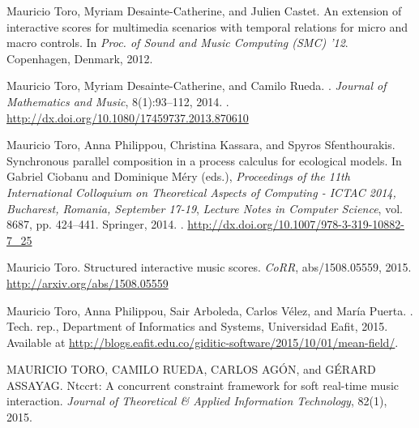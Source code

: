 \documentclass[]{lipics-iclp}
\theoremstyle{plain}\newtheorem{mainthm}[thm]{Main Theorem}
\theoremstyle{definition}\newtheorem{crucialdef}[thm]{Crucial Definition}
\begin{document}
\begin{thebibliography}{{Tor}16a}
Mauricio Toro, Myriam Desainte-Catherine, and Julien Castet.
\newblock An extension of interactive scores for multimedia scenarios with
  temporal relations for micro and macro controls.
\newblock In \emph{Proc. of Sound and Music Computing (SMC) '12}. Copenhagen,
  Denmark, 2012.

Mauricio Toro, Myriam Desainte-Catherine, and Camilo Rueda.
.
\newblock \emph{Journal of Mathematics and Music}, 8(1):93--112, 2014.
\newblock {}.
\newline\urlprefix\url{http://dx.doi.org/10.1080/17459737.2013.870610}

Mauricio Toro, Anna Philippou, Christina Kassara, and Spyros Sfenthourakis.
\newblock Synchronous parallel composition in a process calculus for ecological
  models.
\newblock In Gabriel Ciobanu and Dominique M{\'{e}}ry (eds.), \emph{Proceedings
  of the 11th International Colloquium on Theoretical Aspects of Computing -
  {ICTAC} 2014, Bucharest, Romania, September 17-19}, \emph{Lecture Notes in
  Computer Science}, vol. 8687, pp. 424--441. Springer, 2014.
\newblock {}.
\newline\urlprefix\url{http://dx.doi.org/10.1007/978-3-319-10882-7_25}

Mauricio Toro.
\newblock Structured interactive music scores.
\newblock \emph{CoRR}, abs/1508.05559, 2015.
\newline\urlprefix\url{http://arxiv.org/abs/1508.05559}

Mauricio Toro, Anna Philippou, Sair Arboleda, Carlos V\'{e}lez, and Mar\'{i}a
  Puerta.
.
\newblock Tech. rep., Department of Informatics and Systems, Universidad Eafit,
  2015.
\newblock Available at
  \url{http://blogs.eafit.edu.co/giditic-software/2015/10/01/mean-field/}.

MAURICIO TORO, CAMILO RUEDA, CARLOS AG{\'O}N, and G{\'E}RARD ASSAYAG.
\newblock Ntccrt: A concurrent constraint framework for soft real-time music
  interaction.
\newblock \emph{Journal of Theoretical \& Applied Information Technology},
  82(1), 2015.


\end{thebibliography}
\end{document}
